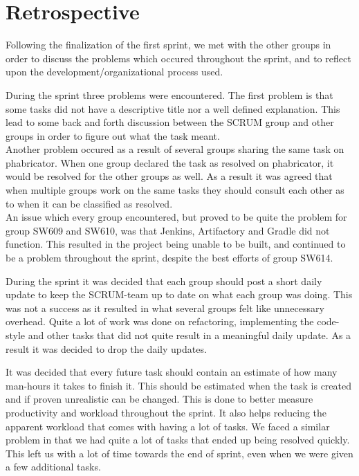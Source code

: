 \section{Retrospective}\label{S1Retro}
Following the finalization of the first sprint, we met with the other
groups in order to discuss the problems which occured
throughout the sprint, and to reflect upon the development/organizational
process used.\nl

During the sprint three problems were encountered. The first problem is that
some tasks did not have a descriptive title nor a well defined explanation.
This lead to some back and forth discussion between the SCRUM group and other
groups in order to figure out what the task meant.\\
Another problem occured as a result of several groups sharing the same task on
phabricator. When one group declared the task as resolved on phabricator, it
would be resolved for the other groups as well. As a result it was agreed that
when multiple groups work on the same tasks they should consult each other as to
when it can be classified as resolved.\\
An issue which every group encountered, but proved to be quite the problem for
group SW609 and SW610, was that Jenkins, Artifactory and Gradle did not
function.
This resulted in the project being unable to be built, and continued to be a
problem throughout the sprint, despite the best efforts of group SW614.\nl

During the sprint it was decided that each group should post a short daily
update to keep the SCRUM-team up to date on what each group was doing. This was
not a success as it resulted in what several groups felt like unnecessary
overhead. Quite a lot of work was done on refactoring, implementing the
code-style and other tasks that did not quite result in a meaningful daily
update. As a result it was decided to drop the daily updates.\nl

It was decided that every future task should contain an estimate of how many
man-hours it takes to finish it. This should be estimated when the
task is created and if proven unrealistic can be changed. This is done to
better measure productivity and workload throughout the sprint. It also helps
reducing the apparent workload that comes with having a lot of tasks. We faced a
similar problem in that we had quite a lot of tasks that ended up being resolved
quickly. This left us with a lot of time towards the end of sprint, even when we
were given a few additional tasks.

